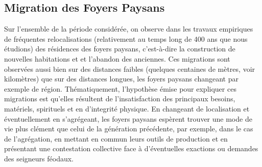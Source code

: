 %

\subsection{Migration des Foyers Paysans \label{meca-migration}}


Sur l'ensemble de la période considérée, on observe dans les travaux empiriques de \og fréquentes\fg{} relocalisations (relativement au temps long de 400 ans que nous étudions) des résidences des foyers paysans, c'est-à-dire la construction de nouvelles habitations et  et l'abandon des anciennes.
Ces \og migrations\fg{} sont observées aussi bien sur des distances faibles (quelques centaines de mètres, voir kilomètres) que sur des distances longues, les foyers paysans changeant par exemple de région.
Thématiquement, l'hypothèse émise pour expliquer ces migrations est qu'elles résultent de l'insatisfaction des principaux besoins, matériels, spirituels et en d'integrité physique.
En changeant de localisation et éventuellement en s'agrégeant, les foyers paysans espèrent trouver une mode de vie plus clément que celui de la génération précédente, par exemple, dans le cas de l'agrégation, en mettant en commun leurs outils de production et en présentant une contestation collective face à d'éventuelles exactions ou demandes des seigneurs féodaux.


